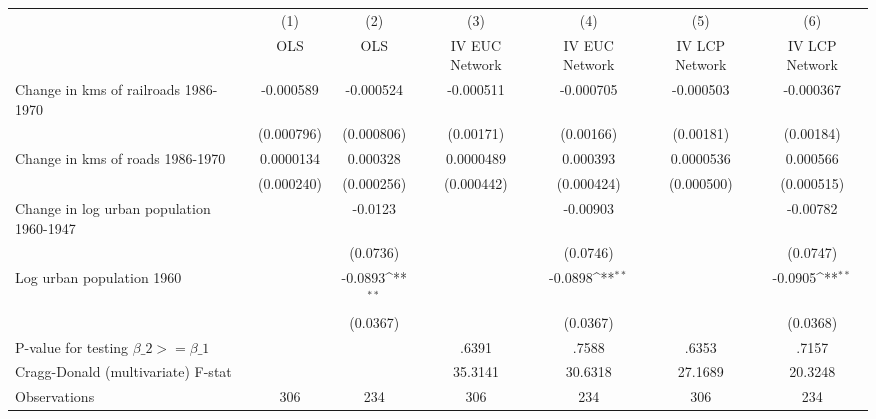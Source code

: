 {
\def\sym#1{\ifmmode^{#1}\else\(^{#1}\)\fi}
\begin{tabular}{l*{6}{c}}
\hline\hline
                &\multicolumn{1}{c}{(1)}&\multicolumn{1}{c}{(2)}&\multicolumn{1}{c}{(3)}&\multicolumn{1}{c}{(4)}&\multicolumn{1}{c}{(5)}&\multicolumn{1}{c}{(6)}\\
                &\multicolumn{1}{c}{OLS}&\multicolumn{1}{c}{OLS}&\multicolumn{1}{c}{IV EUC Network}&\multicolumn{1}{c}{IV EUC Network}&\multicolumn{1}{c}{IV LCP Network}&\multicolumn{1}{c}{IV LCP Network}\\
\hline
Change in kms of railroads 1986-1970&-0.000589         &-0.000524         &-0.000511         &-0.000705         &-0.000503         &-0.000367         \\
                &(0.000796)         &(0.000806)         &(0.00171)         &(0.00166)         &(0.00181)         &(0.00184)         \\
[1em]
Change in kms of roads 1986-1970&0.0000134         & 0.000328         &0.0000489         & 0.000393         &0.0000536         & 0.000566         \\
                &(0.000240)         &(0.000256)         &(0.000442)         &(0.000424)         &(0.000500)         &(0.000515)         \\
[1em]
Change in log urban population 1960-1947&                  &  -0.0123         &                  & -0.00903         &                  & -0.00782         \\
                &                  & (0.0736)         &                  & (0.0746)         &                  & (0.0747)         \\
[1em]
Log urban population 1960&                  &  -0.0893\sym{**} &                  &  -0.0898\sym{**} &                  &  -0.0905\sym{**} \\
                &                  & (0.0367)         &                  & (0.0367)         &                  & (0.0368)         \\
\hline
P-value for testing $\beta\_{2} >= \beta\_{1}$&                  &                  &    .6391         &    .7588         &    .6353         &    .7157         \\
Cragg-Donald (multivariate) F-stat&                  &                  &  35.3141         &  30.6318         &  27.1689         &  20.3248         \\
Observations    &      306         &      234         &      306         &      234         &      306         &      234         \\
\hline\hline
\end{tabular}
}
